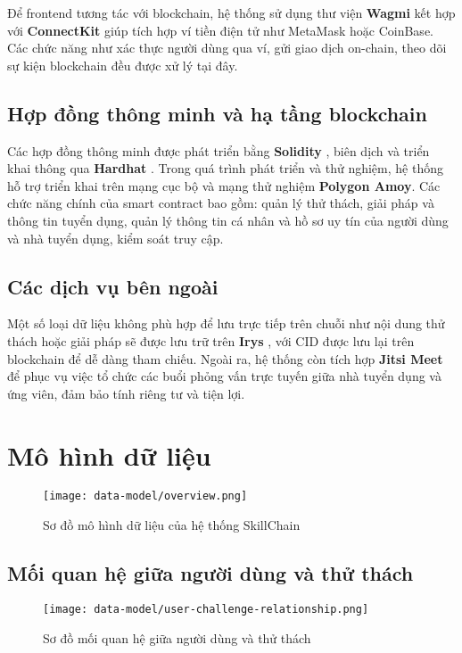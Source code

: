 Để frontend tương tác với blockchain, hệ thống sử dụng thư viện \textbf{Wagmi} \cite{wagmi-web} kết hợp với \textbf{ConnectKit} \cite{connectkit-web} giúp tích hợp ví tiền điện tử như MetaMask hoặc CoinBase.
Các chức năng như xác thực người dùng qua ví, gửi giao dịch on-chain, theo dõi sự kiện blockchain đều được xử lý tại đây.

\subsection{Hợp đồng thông minh và hạ tầng blockchain}

Các hợp đồng thông minh được phát triển bằng \textbf{Solidity} \cite{solidity-web}, biên dịch và triển khai thông qua \textbf{Hardhat} \cite{hardhat-web}. Trong quá trình phát triển và thử nghiệm, hệ thống hỗ trợ triển khai trên mạng cục bộ và mạng thử nghiệm \textbf{Polygon Amoy}.
Các chức năng chính của smart contract bao gồm: quản lý thử thách, giải pháp và thông tin tuyển dụng, quản lý thông tin cá nhân và hồ sơ uy tín của người dùng và nhà tuyển dụng, kiểm soát truy cập.

\subsection{Các dịch vụ bên ngoài}

Một số loại dữ liệu không phù hợp để lưu trực tiếp trên chuỗi như nội dung thử thách hoặc giải pháp sẽ được lưu trữ trên \textbf{Irys} \cite{irys-web}, với CID được lưu lại trên blockchain để dễ dàng tham chiếu.
Ngoài ra, hệ thống còn tích hợp \textbf{Jitsi Meet} \cite{jitsi-handbook-web} để phục vụ việc tổ chức các buổi phỏng vấn trực tuyến giữa nhà tuyển dụng và ứng viên, đảm bảo tính riêng tư và tiện lợi.

\section{Mô hình dữ liệu}

\begin{figure}[H]
  \centering
  \texttt{[image: data-model/overview.png]}
  \caption{Sơ đồ mô hình dữ liệu của hệ thống SkillChain}
  \label{fig:overview-relationship}
\end{figure}

\subsection{Mối quan hệ giữa người dùng và thử thách}
\begin{figure}[H]
  \centering
  \texttt{[image: data-model/user-challenge-relationship.png]}
  \caption{Sơ đồ mối quan hệ giữa người dùng và thử thách}
  \label{fig:user-challenge-relationship}
\end{figure}

